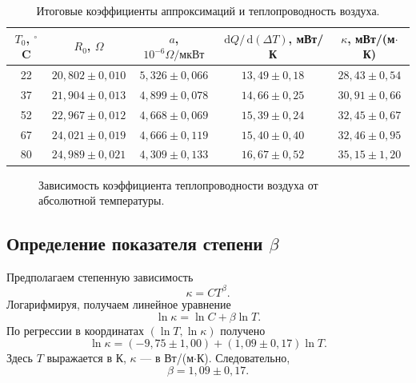 \documentclass[a4paper,12pt]{article}
\newcommand{\dd}{\,\mathrm{d}}
\begin{document}
\begin{table}[H]
\centering
\caption{Итоговые коэффициенты аппроксимаций и теплопроводность воздуха.}
\begin{tabular}{ccccc}
\toprule
$T_0$, $^\circ$C & $R_0$, $\Omega$ & $a$, $10^{-6}\Omega/\text{мкВт}$ & $\dd Q/\dd(\Delta T)$, мВт/К & $\kappa$, мВт/(м$\cdot$К) \\
\midrule
22 & $20{,}802 \pm 0{,}010$ & $5{,}326 \pm 0{,}066$ & $13{,}49 \pm 0{,}18$ & $28{,}43 \pm 0{,}54$ \\
37 & $21{,}904 \pm 0{,}013$ & $4{,}899 \pm 0{,}078$ & $14{,}66 \pm 0{,}25$ & $30{,}91 \pm 0{,}66$ \\
52 & $22{,}967 \pm 0{,}012$ & $4{,}668 \pm 0{,}069$ & $15{,}39 \pm 0{,}24$ & $32{,}45 \pm 0{,}67$ \\
67 & $24{,}021 \pm 0{,}019$ & $4{,}666 \pm 0{,}119$ & $15{,}40 \pm 0{,}40$ & $32{,}46 \pm 0{,}95$ \\
80 & $24{,}989 \pm 0{,}021$ & $4{,}309 \pm 0{,}133$ & $16{,}67 \pm 0{,}52$ & $35{,}15 \pm 1{,}20$ \\
\bottomrule
\end{tabular}
\end{table}

\KappaData

\begin{figure}[H]
\centering
{}
\caption{Зависимость коэффициента теплопроводности воздуха от абсолютной температуры.}
\end{figure}

\subsection{Определение показателя степени \texorpdfstring{$\beta$}{beta}}
Предполагаем степенную зависимость
\[
\kappa=C T^\beta.
\]
Логарифмируя, получаем линейное уравнение
\begin{equation}
\ln\kappa=\ln C+\beta\ln T.
\label{eq:log_law}
\end{equation}
По регрессии в координатах $(\ln T,\ln\kappa)$ получено
\begin{equation}
\ln\kappa=(-9{,}75\pm1{,}00)+(1{,}09\pm0{,}17)\ln T.
\label{eq:beta_result}
\end{equation}
Здесь $T$ выражается в К, $\kappa$ --- в Вт/(м$\cdot$К). Следовательно,
\[
\boxed{\beta=1{,}09\pm0{,}17}.
\]
\end{document}
